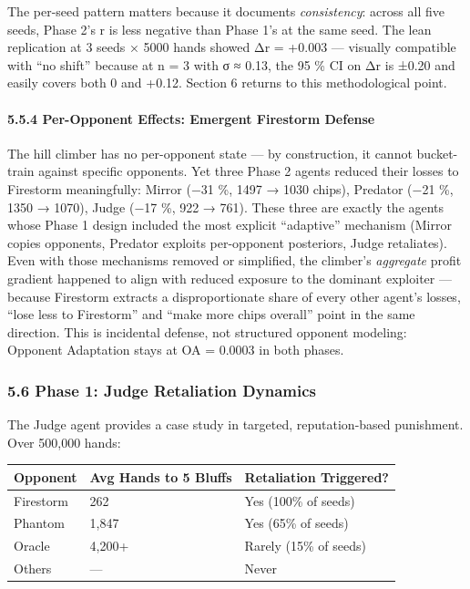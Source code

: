 \documentclass[
]{article}
\begin{document}
The per-seed pattern matters because it documents \emph{consistency}:
across all five seeds, Phase 2's r is less negative than Phase 1's at
the same seed. The lean replication at 3 seeds × 5000 hands showed Δr =
+0.003 --- visually compatible with ``no shift'' because at n = 3 with σ
≈ 0.13, the 95 \% CI on Δr is ±0.20 and easily covers both 0 and +0.12.
Section 6 returns to this methodological point.

\hypertarget{per-opponent-effects-emergent-firestorm-defense}{%
\paragraph{5.5.4 Per-Opponent Effects: Emergent Firestorm
Defense}\label{per-opponent-effects-emergent-firestorm-defense}}

The hill climber has no per-opponent state --- by construction, it
cannot bucket-train against specific opponents. Yet three Phase 2 agents
reduced their losses to Firestorm meaningfully: Mirror (−31 \%, 1497 →
1030 chips), Predator (−21 \%, 1350 → 1070), Judge (−17 \%, 922 → 761).
These three are exactly the agents whose Phase 1 design included the
most explicit ``adaptive'' mechanism (Mirror copies opponents, Predator
exploits per-opponent posteriors, Judge retaliates). Even with those
mechanisms removed or simplified, the climber's \emph{aggregate} profit
gradient happened to align with reduced exposure to the dominant
exploiter --- because Firestorm extracts a disproportionate share of
every other agent's losses, ``lose less to Firestorm'' and ``make more
chips overall'' point in the same direction. This is incidental defense,
not structured opponent modeling: Opponent Adaptation stays at OA =
0.0003 in both phases.

\hypertarget{phase-1-judge-retaliation-dynamics}{%
\subsubsection{5.6 Phase 1: Judge Retaliation
Dynamics}\label{phase-1-judge-retaliation-dynamics}}

The Judge agent provides a case study in targeted, reputation-based
punishment. Over 500,000 hands:

\begin{longtable}[]{@{}lll@{}}
\toprule\noalign{}
Opponent & Avg Hands to 5 Bluffs & Retaliation Triggered? \\
\midrule\noalign{}
\endhead
\bottomrule\noalign{}
\endlastfoot
Firestorm & 262 & Yes (100\% of seeds) \\
Phantom & 1,847 & Yes (65\% of seeds) \\
Oracle & 4,200+ & Rarely (15\% of seeds) \\
Others & --- & Never \\
\end{longtable}
\end{document}
